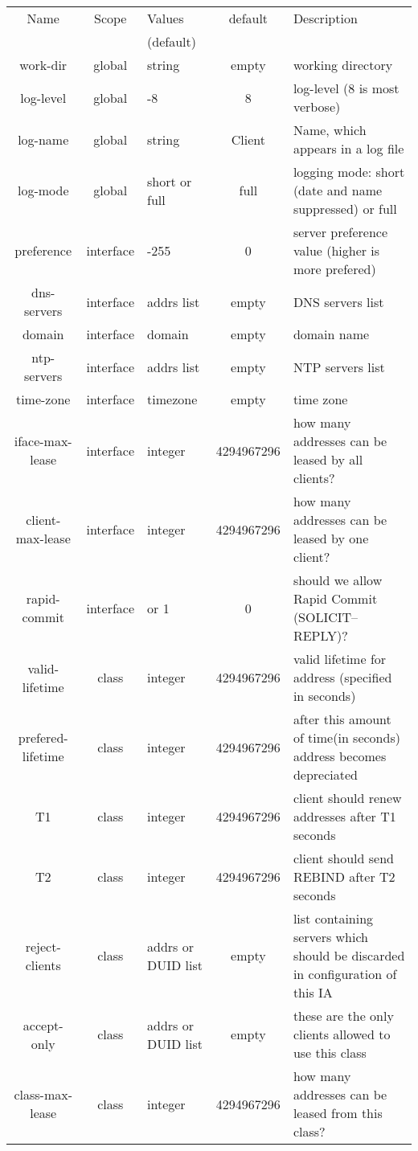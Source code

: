 \begin{tabular}{|c|c|>{\centering}p{1.7cm}<{}|c|p{6cm}|}
\hline
Name             & Scope   & Values      & default    & Description \\
                 &         & (default)   &  & \\
\hline
work-dir         & global  & string      & empty      & working directory \\
log-level        & global  & 1-8         & 8          & log-level (8 is most verbose) \\
log-name         & global  & string      & Client     & Name, which appears in a log file\\
log-mode         & global  &short or full& full       & logging mode: short (date and name suppressed) or full \\

preference       &interface& 0-255       & 0          & server preference value (higher is more prefered) \\
dns-servers      &interface& addrs list  & empty      & DNS servers list \\
domain           &interface& domain      & empty      & domain name \\
ntp-servers      &interface& addrs list  & empty      & NTP servers list \\
time-zone        &interface& timezone    & empty      & time zone \\
iface-max-lease  &interface& integer     & 4294967296 & how many addresses can be leased by all clients? \\
client-max-lease &interface& integer     & 4294967296 & how many addresses can be leased by one client? \\
rapid-commit     &interface& 0 or 1      & 0          & should we allow Rapid Commit (SOLICIT--REPLY)? \\

valid-lifetime   & class   & integer     & 4294967296 & valid lifetime for address (specified in seconds)\\
prefered-lifetime& class   & integer     & 4294967296 & after this amount of time(in seconds) address becomes depreciated\\
T1               & class   & integer     & 4294967296 & client should renew addresses after T1 seconds \\
T2               & class   & integer     & 4294967296 & client should send REBIND after T2 seconds\\
reject-clients   & class   & addrs or 
                             DUID list   & empty      & list containing servers which should be discarded in configuration of this IA \\
accept-only      & class   & addrs or
                             DUID list   & empty      & these are the only clients allowed to use this class\\
class-max-lease  & class   & integer     & 4294967296 & how many addresses can be leased from this class? \\


\end{tabular}
